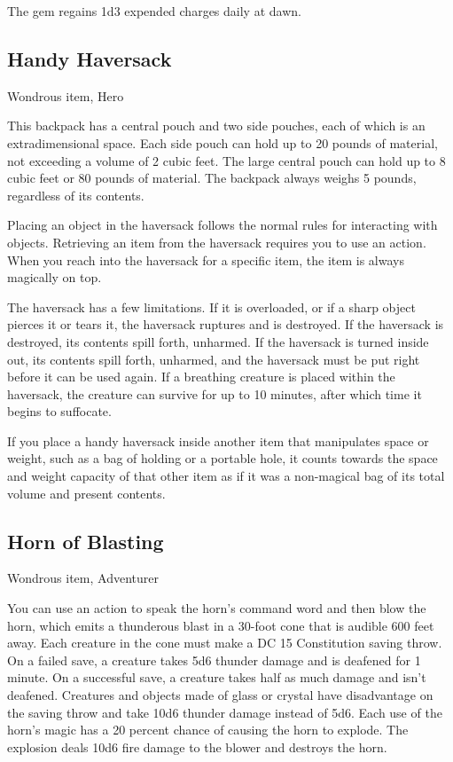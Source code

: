 The gem regains 1d3 expended charges daily at dawn.

\subsection{Handy Haversack}
Wondrous item, Hero

This backpack has a central pouch and two side pouches, each of which is an extradimensional space. Each side pouch can hold up to 20 pounds of material, not exceeding a volume of 2 cubic feet. The large central pouch can hold up to 8 cubic feet or 80 pounds of material. The backpack always weighs 5 pounds, regardless of its contents.

Placing an object in the haversack follows the normal rules for interacting with objects. Retrieving an item from the haversack requires you to use an action. When you reach into the haversack for a specific item, the item is always magically on top.

The haversack has a few limitations. If it is overloaded, or if a sharp object pierces it or tears it, the haversack ruptures and is destroyed. If the haversack is destroyed, its contents spill forth, unharmed. If the haversack is turned inside out, its contents spill forth, unharmed, and the haversack must be put right before it can be used again. If a breathing creature is placed within the haversack, the creature can survive for up to 10 minutes, after which time it begins to suffocate.

If you place a handy haversack inside another item that manipulates space or weight, such as a bag of holding or a portable hole, it counts towards the space and weight capacity of that other item as if it was a non-magical bag of its total volume and present contents.

\subsection{Horn of Blasting}
Wondrous item, Adventurer 

You can use an action to speak the horn's command word and then blow the horn, which emits a thunderous blast in a 30-foot cone that is audible 600 feet away. Each creature in the cone must make a DC 15 Constitution saving throw. On a failed save, a creature takes 5d6 thunder damage and is deafened for 1 minute. On a successful save, a creature takes half as much damage and isn't deafened. Creatures and objects made of glass or crystal have disadvantage on the saving throw and take 10d6 thunder damage instead of 5d6.  Each use of the horn's magic has a 20 percent chance of causing the horn to explode. The explosion deals 10d6 fire damage to the blower and destroys the horn.

